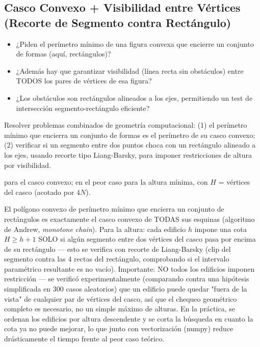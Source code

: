 \subsection{Casco Convexo + Visibilidad entre Vértices (Recorte de Segmento contra Rectángulo)}


\begin{itemize}
\item ¿Piden el perímetro mínimo de una figura convexa que encierre un conjunto de formas (aquí, rectángulos)?
\item ¿Además hay que garantizar visibilidad (línea recta sin obstáculos) entre TODOS los pares de vértices de esa figura?
\item ¿Los obstáculos son rectángulos alineados a los ejes, permitiendo un test de intersección segmento-rectángulo eficiente?
\end{itemize}

 Resolver problemas combinados de geometría computacional: (1) el perímetro mínimo que encierra un conjunto de formas es el perímetro de su casco convexo; (2) verificar si un segmento entre dos puntos choca con un rectángulo alineado a los ejes, usando recorte tipo Liang-Barsky, para imponer restricciones de altura por visibilidad.

  para el casco convexo;  en el peor caso para la altura mínima, con $H$ = vértices del casco (acotado por $4N$).

 El polígono convexo de perímetro mínimo que encierra un conjunto de rectángulos es exactamente el casco convexo de TODAS sus esquinas (algoritmo de Andrew, \emph{monotone chain}). Para la altura: cada edificio $h$ impone una cota $H \ge h+1$ SOLO si algún segmento entre dos vértices del casco pasa por encima de su rectángulo — esto se verifica con recorte de Liang-Barsky (clip del segmento contra las 4 rectas del rectángulo, comprobando si el intervalo paramétrico resultante es no vacío). Importante: NO todos los edificios imponen restricción — se verificó experimentalmente (comparando contra una hipótesis simplificada en 300 casos aleatorios) que un edificio puede quedar "fuera de la vista" de cualquier par de vértices del casco, así que el chequeo geométrico completo es necesario, no un simple máximo de alturas. En la práctica, se ordenan los edificios por altura descendente y se corta la búsqueda en cuanto la cota ya no puede mejorar, lo que junto con vectorización (numpy) reduce drásticamente el tiempo frente al peor caso teórico.

